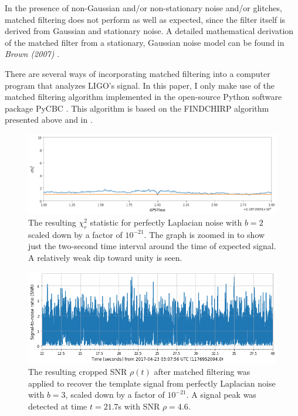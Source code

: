 \documentclass[preprint,
letterpaper,
 amsmath,amssymb,
 aps,
]{revtex4-2}
\begin{document}
In the presence of non-Gaussian and/or non-stationary noise and/or glitches, matched filtering does not perform as well as expected, since the filter itself is derived from Gaussian and stationary noise. A detailed mathematical derivation of the matched filter from a stationary, Gaussian noise model can be found in \textit{Brown (2007)} \cite{brown2007searching}.


There are several ways of incorporating matched filtering into a computer program that analyzes LIGO's signal. In this paper, I only make use of the matched filtering algorithm implemented in the open-source Python software package PyCBC \cite{pycbc}. This algorithm is based on the FINDCHIRP algorithm presented above and in \cite{findchirp}.
\begin{widetext}
\begin{figure}[t]
\includegraphics[width = .9\textwidth]{chi2 laplace b=2.png}
\caption{The resulting $\chi^2_r$ statistic for perfectly Laplacian noise with $b=2$ scaled down by a factor of $10^{-21}$. The graph is zoomed in to show just the two-second time interval around the time of expected signal. A relatively weak dip toward unity is seen.}
\centering
\end{figure} 

\begin{figure}[t]
\includegraphics[width = .9\textwidth]{laplacian b=3 template 1.png}
\caption{The resulting cropped SNR $\rho(t)$ after matched filtering was applied to recover the template signal from perfectly Laplacian noise with $b=3$, scaled down by a factor of $10^{-21}$. A signal peak was detected at time $t = 21.7$s with SNR $\rho = 4.6$.}
\centering
\end{figure}
\end{widetext}
\end{document}
